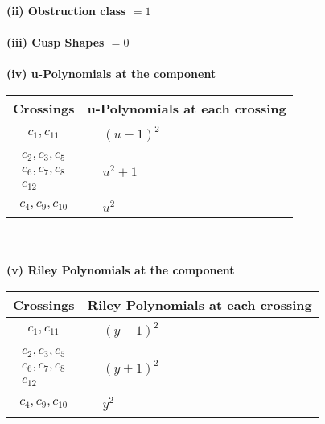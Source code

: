 \documentclass[1p]{elsarticle_modified}
\theoremstyle{definition}
\begin{document}
\flushleft \textbf{(ii) Obstruction class $= 1$}\\~\\
\flushleft \textbf{(iii) Cusp Shapes $= 0$}\\~\\
\newpage\renewcommand{\arraystretch}{1}
\flushleft \textbf{(iv) u-Polynomials at the component}\newline \\
\begin{tabular}{m{50pt}|m{274pt}}
Crossings & \hspace{64pt}u-Polynomials at each crossing \\
\hline $$\begin{aligned}c_{1},c_{11}\end{aligned}$$&$\begin{aligned}
&(u-1)^2
\end{aligned}$\\
\hline $$\begin{aligned}c_{2},c_{3},c_{5}\\c_{6},c_{7},c_{8}\\c_{12}\end{aligned}$$&$\begin{aligned}
&u^2+1
\end{aligned}$\\
\hline $$\begin{aligned}c_{4},c_{9},c_{10}\end{aligned}$$&$\begin{aligned}
&u^2
\end{aligned}$\\
\hline
\end{tabular}\\~\\
\newpage\renewcommand{\arraystretch}{1}
\flushleft \textbf{(v) Riley Polynomials at the component}\newline \\
\begin{tabular}{m{50pt}|m{274pt}}
Crossings & \hspace{64pt}Riley Polynomials at each crossing \\
\hline $$\begin{aligned}c_{1},c_{11}\end{aligned}$$&$\begin{aligned}
&(y-1)^2
\end{aligned}$\\
\hline $$\begin{aligned}c_{2},c_{3},c_{5}\\c_{6},c_{7},c_{8}\\c_{12}\end{aligned}$$&$\begin{aligned}
&(y+1)^2
\end{aligned}$\\
\hline $$\begin{aligned}c_{4},c_{9},c_{10}\end{aligned}$$&$\begin{aligned}
&y^2
\end{aligned}$\\
\hline
\end{tabular}\\~\\
\end{document}
